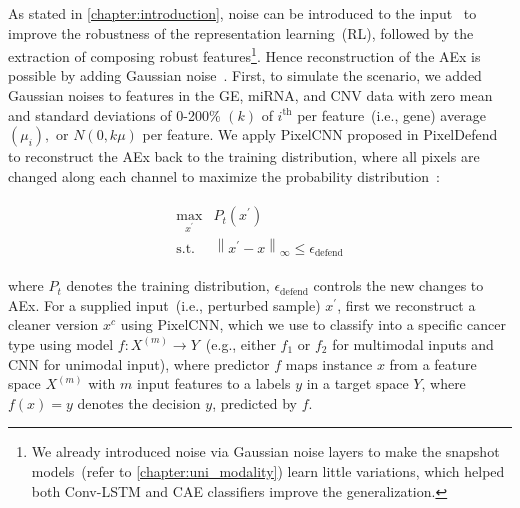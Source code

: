 \hspace*{3.5mm} As stated in \cref{chapter:introduction}, noise can be introduced to the input~\cite{min2018survey} to improve the robustness of the representation learning~(RL), followed by the extraction of composing robust features\footnote{We already introduced noise via Gaussian noise layers to make the snapshot models~(refer to \cref{chapter:uni_modality}) learn little variations, which helped both Conv-LSTM and CAE classifiers improve the generalization. }. Hence reconstruction of the AEx is possible by adding Gaussian noise~\cite{OOD19}. First, to simulate the scenario, we added Gaussian noises to features in the GE, miRNA, and CNV data with zero mean and standard deviations of 0-200\% $(k)$ of $i^{\text {th}}$ per feature~(i.e., gene) average $\left(\mu_{i}\right),$ or $N(0, k \mu)$ per feature. We apply PixelCNN proposed in PixelDefend~\cite{song2017pixeldefend} to reconstruct the AEx back to the training distribution, where all pixels are changed along each channel to maximize the probability distribution~\cite{song2017pixeldefend}:

\vspace{-6mm}
\begin{align}
    \begin{array}{cl}
        \max _{x^{\prime}} & {P}_{t}\left(x^{\prime}\right) \\
        \text {s.t.} & \left\|x^{\prime}-x\right\|_{\infty} \leq \epsilon_{\text {defend}}
    \end{array}
\end{align}

\hspace*{3.5mm} where ${P}_{t}$ denotes the training distribution, $\epsilon_{\text {defend}}$ controls the new changes to AEx. For a supplied input~(i.e., perturbed sample) $x^{\prime}$, first we reconstruct a cleaner version $x^c$ using PixelCNN, which we use to classify into a specific cancer type using model $f: {X}^{(m)} \rightarrow {Y}$~(e.g., either $f_1$ or $f_2$ for multimodal inputs and CNN for unimodal input), where predictor $f$ maps instance $x$ from a feature space ${X}^{(m)}$ with $m$ input features to a labels $y$ in a target space ${Y}$, where $f(x)=y$ denotes the decision $y$, predicted by $f$. %

